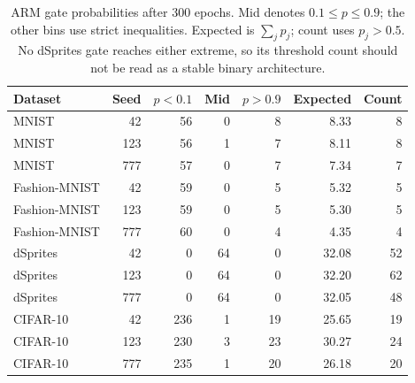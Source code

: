 \begin{table}[H]
\caption{ARM gate probabilities after 300 epochs. Mid denotes $0.1\le p\le0.9$; the other bins use strict inequalities. Expected is $\sum_j p_j$; count uses $p_j>0.5$. No dSprites gate reaches either extreme, so its threshold count should not be read as a stable binary architecture.}\label{tab:armgates}
\small
\setlength{\tabcolsep}{3pt}
\begin{tabular*}{\textwidth}{@{\extracolsep{\fill}}lrrrrrr@{}}
\toprule
Dataset & Seed & $p<0.1$ & Mid & $p>0.9$ & Expected & Count \\
\midrule
MNIST & 42 & 56 & 0 & 8 & 8.33 & 8 \\
MNIST & 123 & 56 & 1 & 7 & 8.11 & 8 \\
MNIST & 777 & 57 & 0 & 7 & 7.34 & 7 \\
Fashion-MNIST & 42 & 59 & 0 & 5 & 5.32 & 5 \\
Fashion-MNIST & 123 & 59 & 0 & 5 & 5.30 & 5 \\
Fashion-MNIST & 777 & 60 & 0 & 4 & 4.35 & 4 \\
dSprites & 42 & 0 & 64 & 0 & 32.08 & 52 \\
dSprites & 123 & 0 & 64 & 0 & 32.20 & 62 \\
dSprites & 777 & 0 & 64 & 0 & 32.05 & 48 \\
CIFAR-10 & 42 & 236 & 1 & 19 & 25.65 & 19 \\
CIFAR-10 & 123 & 230 & 3 & 23 & 30.27 & 24 \\
CIFAR-10 & 777 & 235 & 1 & 20 & 26.18 & 20 \\
\bottomrule\end{tabular*}
\end{table}
